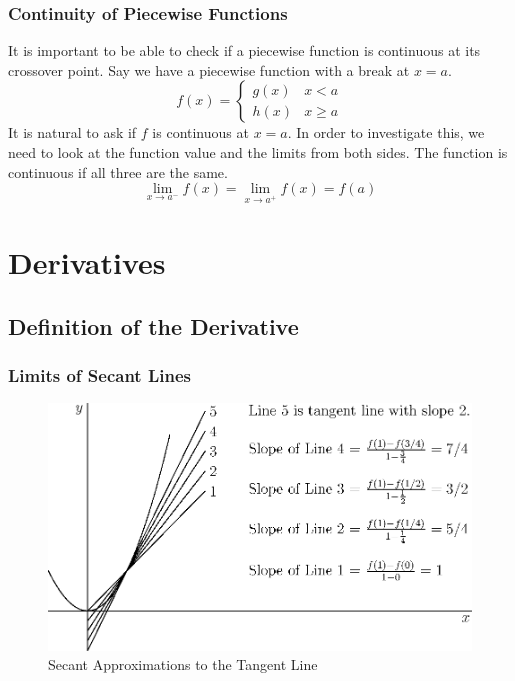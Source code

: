 \documentclass[fleqn]{report}
\begin{document}
\subsection{Continuity of Piecewise Functions}
\label{piecewise-continuity}

It is important to be able to check if a piecewise function is
continuous at its crossover point. Say we have a piecewise
function with a break at $x=a$.
\begin{equation*}
f(x) = \left\{ \begin{matrix} g(x) & x < a \\ h(x) & x \geq a
\end{matrix} \right.
\end{equation*}
It is natural to ask if $f$ is continuous at $x=a$. In order
to investigate this, we need to look at the function value and
the limits from both sides. The function is continuous if all
three are the same.
\begin{equation*}
\lim_{x \rightarrow a^-} f(x) = 
\lim_{x \rightarrow a^+} f(x) = f(a)
\end{equation*}

\chapter{Derivatives}
\label{derivatives}

\section{Definition of the Derivative}
\label{derivative-definition}

\subsection{Limits of Secant Lines}
\label{secant-lines}

\begin{figure}[t]
\centering
\includegraphics{figure13.eps}
\caption{Secant Approximations to the Tangent Line}
\label{figure-secant-approximations2}
\end{figure}
\end{document}
